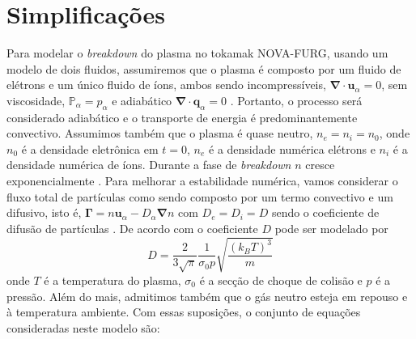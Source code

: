 \documentclass[12pt,oneside,a4paper]{abntex2}
\begin{document}
\section{Simplificações}
\noindent Para modelar o \textit{breakdown} do plasma no tokamak NOVA-FURG, usando um modelo de dois fluidos,  assumiremos que o plasma é composto por um fluido de elétrons e um único fluido de íons, ambos sendo incompressíveis, $\bm{\nabla} \cdot \bm{u}_{\alpha} = 0$, sem viscosidade, $\mathbb{P}_\alpha = p_{\alpha}$ e adiabático $\bm{\nabla} \cdot \bm{q}_{\alpha} = 0$ \cite[pg. 181]{bittencourt}. 
Portanto, o processo será considerado adiabático e o transporte de energia é predominantemente convectivo. Assumimos também que o plasma é quase neutro, $n_e = n_i = n_0$, onde $n_0$ é a densidade eletrônica em $t = 0$, $n_e$ é a densidade numérica elétrons e $n_i$ é a densidade numérica de íons. Durante a fase de \textit{breakdown} $n$ cresce exponencialmente \cite[pg. 52]{kim2013physics}. 
Para melhorar a estabilidade numérica, vamos considerar o fluxo total de partículas como sendo composto por um termo convectivo e um difusivo, isto é, $\bm{\Gamma}=n\bm{u}_{\alpha}-D_{\alpha} \bm{\nabla} n$ \cite[pg. 253]{bittencourt} com $D_e = D_i = D$ sendo o coeficiente de difusão de partículas \cite[pg. 641-647]{bittencourt}. De acordo com  \cite[cap 7]{thermalplasmas}  o coeficiente $D$ pode ser modelado por 
\begin{equation}
 D = \frac{2}{3\sqrt{\pi}} \frac{1}{\sigma_0 p} \sqrt{ \frac{(k_B T)^3}{m} }
\end{equation} 
onde $T$ é a temperatura do plasma, $\sigma_0$ é a secção de choque de colisão e $p$ é a pressão. 
Além do mais, admitimos também que o gás neutro esteja em repouso e à temperatura ambiente. %
Com essas suposições, o conjunto de equações consideradas neste modelo são:
\end{document}
